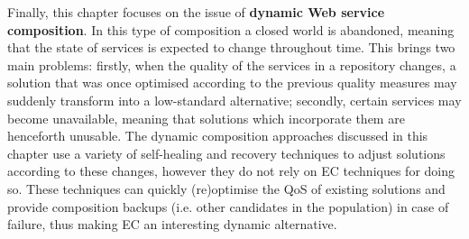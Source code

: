Finally, this chapter focuses on the issue of \textbf{dynamic Web service composition}. In this type of composition a closed world is abandoned, meaning that the state of services is expected to change throughout time. This brings two main problems: firstly, when the quality of the services in a repository changes, a solution that was once optimised according to the previous quality measures may suddenly transform into a low-standard alternative; secondly, certain services may become unavailable, meaning that solutions which incorporate them are henceforth unusable. The dynamic composition approaches discussed in this chapter use a variety of self-healing and recovery techniques to adjust solutions according to these changes, however they do not rely on EC techniques for doing so. These techniques can quickly (re)optimise the QoS of existing solutions and provide composition backups (i.e. other candidates in the population) in case of failure, thus making EC an interesting dynamic alternative.
